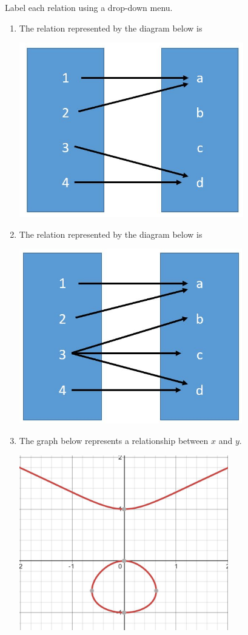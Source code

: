 \documentclass{ximera}
\begin{document}
\begin{problem}\label{prob:160hom1prob3}
Label each relation using a drop-down menu.
\begin{enumerate}
    \item The relation represented by the diagram below is 
    \begin{image}
   \includegraphics[height=3in]{160H1pic1.jpg}
 \end{image}
 \item The relation represented by the diagram below is 
    \begin{image}
   \includegraphics[height=3in]{160H1pic2.jpg}
 \end{image}
 \item The graph below represents a relationship between $x$ and $y$. 
    \begin{image}
   \includegraphics[height=3in]{160H1pic3.jpg}

\end{image}
\end{enumerate}
\end{problem}
\end{document}
